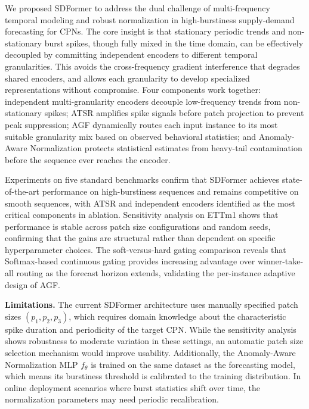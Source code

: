 \documentclass[journal]{IEEEtran}
\begin{document}
We proposed SDFormer to address the dual challenge of multi-frequency
temporal modeling and robust normalization in high-burstiness supply-demand
forecasting for CPNs.
The core insight is that stationary periodic trends and non-stationary burst
spikes, though fully mixed in the time domain, can be effectively decoupled
by committing independent encoders to different temporal granularities.
This avoids the cross-frequency gradient interference that degrades shared
encoders, and allows each granularity to develop specialized representations
without compromise.
Four components work together: independent multi-granularity encoders decouple
low-frequency trends from non-stationary spikes; ATSR amplifies spike signals
before patch projection to prevent peak suppression; AGF dynamically routes
each input instance to its most suitable granularity mix based on observed
behavioral statistics; and Anomaly-Aware Normalization protects statistical
estimates from heavy-tail contamination before the sequence ever reaches the
encoder.

Experiments on five standard benchmarks confirm that SDFormer achieves
state-of-the-art performance on high-burstiness sequences and remains
competitive on smooth sequences, with ATSR and independent encoders
identified as the most critical components in ablation.
Sensitivity analysis on ETTm1 shows that performance is stable across patch
size configurations and random seeds, confirming that the gains are
structural rather than dependent on specific hyperparameter choices.
The soft-versus-hard gating comparison reveals that Softmax-based continuous
gating provides increasing advantage over winner-take-all routing as the
forecast horizon extends, validating the per-instance adaptive design of AGF.

\textbf{Limitations.}
The current SDFormer architecture uses manually specified patch sizes
$(p_1, p_2, p_3)$, which requires domain knowledge about the characteristic
spike duration and periodicity of the target CPN.
While the sensitivity analysis shows robustness to moderate variation in
these settings, an automatic patch size selection mechanism would improve
usability.
Additionally, the Anomaly-Aware Normalization MLP $f_\theta$ is trained
on the same dataset as the forecasting model, which means its burstiness
threshold is calibrated to the training distribution.
In online deployment scenarios where burst statistics shift over time, the
normalization parameters may need periodic recalibration.
\end{document}
